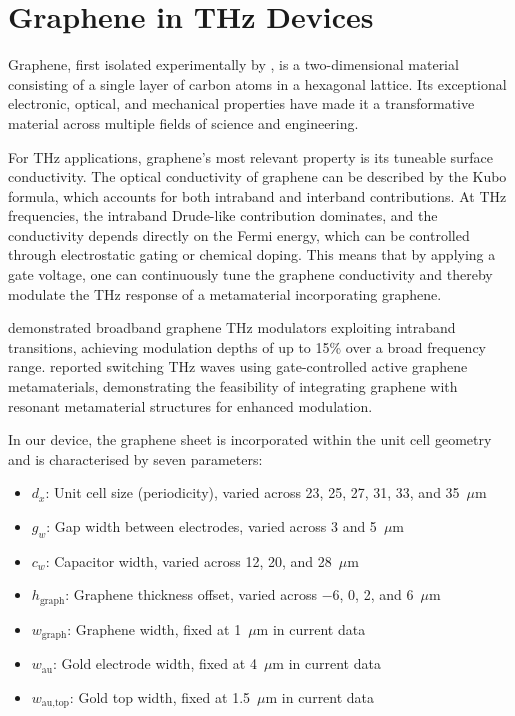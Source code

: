 \documentclass[12pt,a4paper]{report}
\begin{document}
\section{Graphene in THz Devices}
\label{sec:graphene}

Graphene, first isolated experimentally by \citet{novoselov2004}, is a two-dimensional material consisting of a single layer of carbon atoms in a hexagonal lattice. Its exceptional electronic, optical, and mechanical properties have made it a transformative material across multiple fields of science and engineering.

For THz applications, graphene's most relevant property is its tuneable surface conductivity. The optical conductivity of graphene can be described by the Kubo formula, which accounts for both intraband and interband contributions. At THz frequencies, the intraband Drude-like contribution dominates, and the conductivity depends directly on the Fermi energy, which can be controlled through electrostatic gating or chemical doping. This means that by applying a gate voltage, one can continuously tune the graphene conductivity and thereby modulate the THz response of a metamaterial incorporating graphene.

\citet{sensale2012} demonstrated broadband graphene THz modulators exploiting intraband transitions, achieving modulation depths of up to 15\% over a broad frequency range. \citet{lee2012} reported switching THz waves using gate-controlled active graphene metamaterials, demonstrating the feasibility of integrating graphene with resonant metamaterial structures for enhanced modulation.

In our device, the graphene sheet is incorporated within the unit cell geometry and is characterised by seven parameters:
\begin{itemize}[leftmargin=2cm]
    \item $d_x$: Unit cell size (periodicity), varied across 23, 25, 27, 31, 33, and 35~$\mu$m
    \item $g_w$: Gap width between electrodes, varied across 3 and 5~$\mu$m
    \item $c_w$: Capacitor width, varied across 12, 20, and 28~$\mu$m
    \item $h_{\text{graph}}$: Graphene thickness offset, varied across $-6$, 0, 2, and 6~$\mu$m
    \item $w_{\text{graph}}$: Graphene width, fixed at 1~$\mu$m in current data
    \item $w_{\text{au}}$: Gold electrode width, fixed at 4~$\mu$m in current data
    \item $w_{\text{au,top}}$: Gold top width, fixed at 1.5~$\mu$m in current data
\end{itemize}
\end{document}
